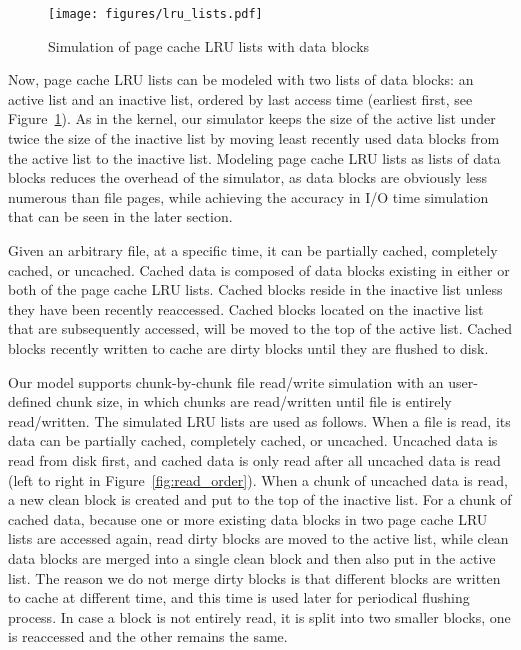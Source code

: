 \documentclass[conference]{IEEEtran}
\begin{document}
			\begin{figure}
   				\centering
   				\texttt{[image: figures/lru\_lists.pdf]}
   				\caption{Simulation of page cache LRU lists with data blocks}	\label{fig:lrulist}
			\end{figure}	
			
			Now, page cache LRU lists can be modeled with two lists of data blocks: 
			an active list and an inactive list, ordered by last access time 
			(earliest first, see Figure~\ref{fig:lrulist}).
			As in the kernel, our simulator keeps the size of the active list under
			twice the size of the inactive list by moving least recently 
            used data blocks from the active list to the inactive list.
			Modeling page cache LRU lists as lists of data blocks reduces the
			overhead of the simulator, as data blocks are obviously less
			numerous than file pages, while achieving the accuracy in I/O time
			simulation that can be seen in the later section.
			
			Given an arbitrary file, at a specific time, it can be partially cached, 
			completely cached, or uncached.
			Cached data is composed of data blocks existing in either or both
            of the page cache LRU lists. Cached blocks reside in the inactive list
            unless they have been recently reaccessed. Cached blocks 
            located on the inactive list that are subsequently accessed, 
            will be moved to the top of the active list. Cached blocks 
            recently written to cache are dirty blocks until they are flushed to disk.

            Our model supports chunk-by-chunk file read/write simulation
            with an user-defined chunk size, in which chunks are read/written 
            until file is entirely read/written. 
            The simulated LRU lists are used as follows. 
            When a file is read, its data can be partially cached, completely cached, 
            or uncached. 
            Uncached data is read from disk first, and cached data is only read 
            after all uncached data is read (left to right in Figure~\ref{fig:read_order}).
            When a chunk of uncached data is read, a new clean block is created 
            and put to the top of the inactive list. 
            For a chunk of cached data, because one or more existing data blocks 
            in two page cache LRU lists are accessed again, read dirty blocks are 
            moved to the active list, while clean data blocks are merged into 
            a single clean block and then also put in the active list. 
			The reason we do not merge dirty blocks is that different blocks 
			are written to cache at different time, and this time is used later for 
			periodical flushing process.
			In case a block is not entirely read, it is split into two smaller blocks, 
			one is reaccessed and the other remains the same.
			
\end{document}
